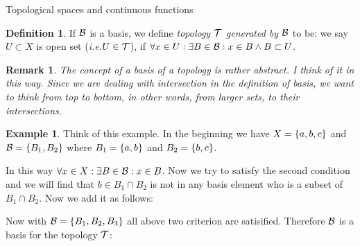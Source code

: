 \documentclass{report}
\newtheorem*{remark}{Remark}
\theoremstyle{definition}
\newtheorem{definition}[theorem]{Definition}
\newtheorem{example}{Example}[theorem]
\newcommand{\set}[1]{\ensuremath\left\{#1\right\}}
\newcommand{\ie}{\textit{i.e.}\xspace}
\newcommand{\ex}{\ensuremath\exists}
\begin{document}
\begin{chapter}{Topological spaces and continuous functions}
\begin{definition}
    If $\mathcal{B}$ is a basis, we define \emph{topology $\mathcal{T}$ generated by
      $\mathcal{B}$} to be: we say $U\subset X$ is open set (\ie $U\in\mathcal{T}$), if
    $\forall x\in U: \exists B\in\mathcal{B}: x\in B \land B\subset U$.
  \end{definition}
  \begin{remark}
    The concept of a basis of a topology is rather abstract. I think
    of it in this way. Since we are dealing with intersection in the
    definition of basis, we want to think from top to bottom, in other
    words, from larger sets, to their intersections.
  \end{remark}
  \begin{example}
    Think of this example. In the beginning we have $X=\set{a,b,c}$
    and ${\B=\set{B_1,B_2}}$ where $B_1=\set{a,b}$ and
    $B_2=\set{b,c}$.

    \begin{figure}[H]
      \centering
    \end{figure}

    In this way $\forall x\in X :\ex B\in \B: x\in B$. Now we try to
    satisfy the second condition and we will find that
    $b\in B_1\cap B_2$ is not in any basis element who is a subset of
    $B_1\cap B_2$. Now we add it as follows:

    \begin{figure}[H]
      \centering
    \end{figure}

    Now with $\B=\set{B_1,B_2,B_3}$ all above two criterion are
    satisified. Therefore $\mathcal{B}$ is a basis for the topology $\mathcal{T}$:

    \begin{figure}[H]
      \centering
    \end{figure}
  \end{example}


\end{chapter}
\end{document}
